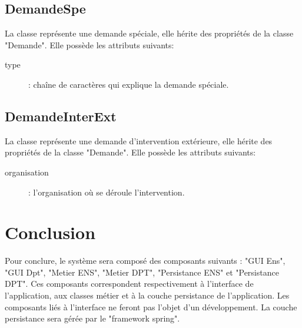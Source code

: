     \subsection{DemandeSpe}
    	La classe  représente une demande spéciale, elle hérite des propriétés de la classe "Demande". Elle possède les attributs suivants:
    	\begin{description}
    		\item[type]: chaîne de caractères qui explique la demande spéciale.
    	\end{description}
    	
    \subsection{DemandeInterExt}
    	La classe  représente une demande d'intervention extérieure, elle hérite des propriétés de la classe "Demande". Elle possède les attributs suivants:
    	\begin{description}
    		\item[organisation]: l'organisation où se déroule l'intervention.  
    	\end{description}

\section{Conclusion}

    Pour conclure, le système sera composé des composants suivants : "GUI Ens", "GUI Dpt", "Metier ENS", "Metier DPT", "Persistance ENS" et "Persistance DPT". Ces composants correspondent respectivement à l'interface de l'application, aux classes métier et à la couche persistance de l'application. Les composants liés à l'interface ne feront pas l'objet d'un développement. La couche persistance sera gérée par le "framework spring".